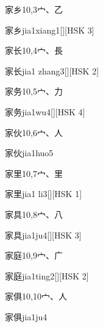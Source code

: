 \begin{entry}{家乡}{10,3}{⼧、⼄}
  \begin{phonetics}{家乡}{jia1xiang1}[][HSK 3]
  \end{phonetics}
\end{entry}

\begin{entry}{家长}{10,4}{⼧、⾧}
  \begin{phonetics}{家长}{jia1 zhang3}[][HSK 2]
  \end{phonetics}
\end{entry}

\begin{entry}{家务}{10,5}{⼧、⼒}
  \begin{phonetics}{家务}{jia1wu4}[][HSK 4]
  \end{phonetics}
\end{entry}

\begin{entry}{家伙}{10,6}{⼧、⼈}
  \begin{phonetics}{家伙}{jia1huo5}
  \end{phonetics}
\end{entry}

\begin{entry}{家里}{10,7}{⼧、⾥}
  \begin{phonetics}{家里}{jia1 li3}[][HSK 1]
  \end{phonetics}
\end{entry}

\begin{entry}{家具}{10,8}{⼧、⼋}
  \begin{phonetics}{家具}{jia1ju4}[][HSK 3]
  \end{phonetics}
\end{entry}

\begin{entry}{家庭}{10,9}{⼧、⼴}
  \begin{phonetics}{家庭}{jia1ting2}[][HSK 2]
  \end{phonetics}
\end{entry}

\begin{entry}{家俱}{10,10}{⼧、⼈}
  \begin{phonetics}{家俱}{jia1ju4}
  \end{phonetics}
\end{entry}

